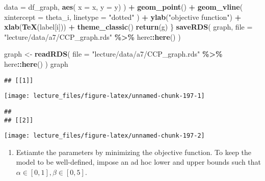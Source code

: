 \documentclass[
]{book}
\newenvironment{Shaded}{\begin{snugshade}}{\end{snugshade}}
\newcommand{\AttributeTok}[1]{\textcolor[rgb]{0.13,0.29,0.53}{#1}}
\newcommand{\FunctionTok}[1]{\textcolor[rgb]{0.13,0.29,0.53}{\textbf{#1}}}
\newcommand{\NormalTok}[1]{#1}
\newcommand{\OtherTok}[1]{\textcolor[rgb]{0.56,0.35,0.01}{#1}}
\newcommand{\SpecialCharTok}[1]{\textcolor[rgb]{0.81,0.36,0.00}{\textbf{#1}}}
\newcommand{\StringTok}[1]{\textcolor[rgb]{0.31,0.60,0.02}{#1}}
\providecommand{\tightlist}{%
  \setlength{\itemsep}{0pt}\setlength{\parskip}{0pt}}
\begin{document}
\begin{Shaded}
\begin{Highlighting}[]
      \AttributeTok{data =}\NormalTok{ df\_graph, }
      \FunctionTok{aes}\NormalTok{(}
        \AttributeTok{x =}\NormalTok{ x, }
        \AttributeTok{y =}\NormalTok{ y)}
\NormalTok{      ) }\SpecialCharTok{+} 
    \FunctionTok{geom\_point}\NormalTok{() }\SpecialCharTok{+}
    \FunctionTok{geom\_vline}\NormalTok{(}
      \AttributeTok{xintercept =}\NormalTok{ theta\_i, }
      \AttributeTok{linetype =} \StringTok{"dotted"}
\NormalTok{      ) }\SpecialCharTok{+}
    \FunctionTok{ylab}\NormalTok{(}\StringTok{"objective function"}\NormalTok{) }\SpecialCharTok{+} 
    \FunctionTok{xlab}\NormalTok{(}\FunctionTok{TeX}\NormalTok{(label[i]))  }\SpecialCharTok{+} 
    \FunctionTok{theme\_classic}\NormalTok{()}
  \FunctionTok{return}\NormalTok{(g)}
\NormalTok{\}}
\FunctionTok{saveRDS}\NormalTok{(}
\NormalTok{  graph, }
  \AttributeTok{file =} \StringTok{"lecture/data/a7/CCP\_graph.rds"} \SpecialCharTok{\%\textgreater{}\%}\NormalTok{ here}\SpecialCharTok{::}\FunctionTok{here}\NormalTok{()}
\NormalTok{)}
\end{Highlighting}
\end{Shaded}

\begin{Shaded}
\begin{Highlighting}[]
\NormalTok{graph }\OtherTok{\textless{}{-}} 
  \FunctionTok{readRDS}\NormalTok{(}
    \AttributeTok{file =} \StringTok{"lecture/data/a7/CCP\_graph.rds"} \SpecialCharTok{\%\textgreater{}\%}\NormalTok{ here}\SpecialCharTok{::}\FunctionTok{here}\NormalTok{()}
\NormalTok{  )}
\NormalTok{graph}
\end{Highlighting}
\end{Shaded}

\begin{verbatim}
## [[1]]
\end{verbatim}

\begin{center}\texttt{[image: lecture\_files/figure-latex/unnamed-chunk-197-1]} \end{center}

\begin{verbatim}
## 
## [[2]]
\end{verbatim}

\begin{center}\texttt{[image: lecture\_files/figure-latex/unnamed-chunk-197-2]} \end{center}

\begin{enumerate}
\def\labelenumi{\arabic{enumi}.}
\setcounter{enumi}{3}
\tightlist
\item
  Estiamte the parameters by minimizing the objective function. To keep the model to be well-defined, impose an ad hoc lower and upper bounds such that \(\alpha \in [0, 1], \beta \in [0, 5]\).
\end{enumerate}
\end{document}
